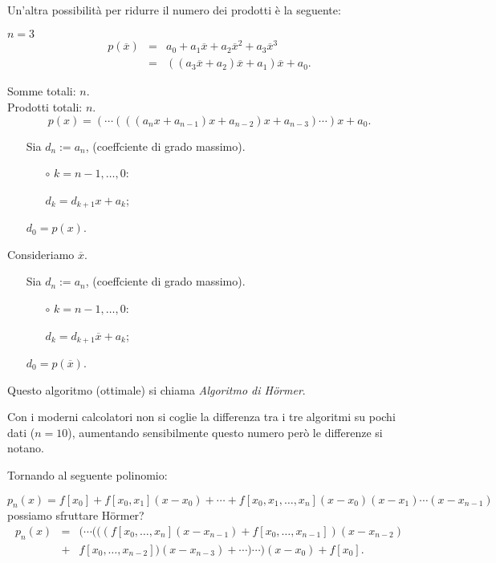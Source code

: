 \begin{flushleft}
Un'altra possibilità per ridurre il numero dei prodotti è la seguente:
\begin{exe}$n = 3$
\[\begin{array}{lcl}
p(\overline{x}) & = & a_0 + a_1\overline{x} + a_2\overline{x}^2 + a_3
\overline{x}^3 \\
& = & ((a_3\overline{x} + a_2)\overline{x} + a_1)\overline{x} +a_0.
\end{array}\]
\end{exe}
Somme totali: $n$.\\

Prodotti totali: $n$.\\
\[
p(x) = \left(\cdots\left(\left(\left(a_nx + a_{n-1}\right)x + a_{n-2}\right)x +
 a_{n-3}\right)\cdots \right)x + a_0.
\]
\end{flushleft}


\begin{itemize}
\item[]Sia $d_n := a_n$, (coeffciente di grado massimo).
\begin{itemize}
\item[$\circ$] $k = n-1, \ldots, 0$:
\item[]
$d_k = d_{k+1}x + a_{k}$;
\end{itemize}
\item[]$d_0 = p(x)$.
\end{itemize}

Consideriamo $\overline{x}$.
\begin{itemize}
\item[]Sia $d_n := a_n$, (coeffciente di grado massimo).
\begin{itemize}
\item[$\circ$] $k = n-1, \ldots, 0$:
\item[]
$d_k = d_{k+1}\overline{x} + a_{k}$;
\end{itemize}
\item[]
$d_0 = p(\overline{x})$.
\end{itemize}

Questo algoritmo (ottimale) si chiama \emph{Algoritmo di H\"ormer}.
\begin{osse}
Con i moderni calcolatori non si coglie la differenza tra i tre algoritmi
su pochi dati ($n = 10$), aumentando sensibilmente questo numero però
le differenze si notano.
\end{osse}

Tornando al seguente polinomio:

\[
p_n(x) = f[x_0] +  f[x_0,x_1](x-x_0)  +
         \cdots + f[x_0,x_1,\ldots,x_n](x-x_0)(x-x_1)\cdots(x-x_{n-1})
\]
possiamo sfruttare  H\"ormer?
\[
\begin{array}{clc}
p_n(x) & = & (\cdots(((f[x_0,\ldots,x_n](x-x_{n-1})
 +  f[x_0,\ldots,x_{n-1}])(x-x_{n-2}) \\
& + & f[x_0,\ldots,x_{n-2}])(x-x_{n-3}) + \cdots )\cdots )(x-x_0) + f[x_0].
\end{array}\]

